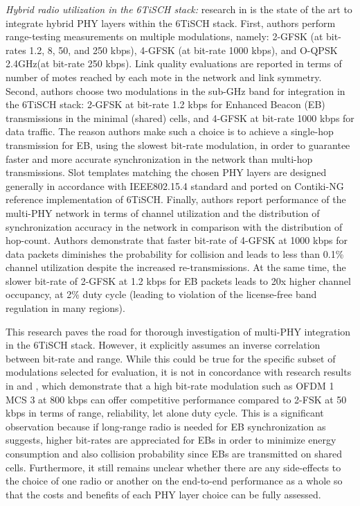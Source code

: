 \documentclass[journal]{IEEEtran}
\newcommand{\oqpsk}        {O-QPSK 2.4GHz}
\begin{document}
\textit{Hybrid radio utilization in the 6TiSCH stack:}  research in \cite{brachmann19ieee} is the state of the art to integrate hybrid PHY layers within the 6TiSCH stack. 
First, authors perform range-testing measurements on multiple modulations, namely: 2-GFSK (at bit-rates 1.2, 8, 50, and 250 kbps), 4-GFSK (at bit-rate 1000 kbps), and \oqpsk (at bit-rate 250 kbps). 
Link quality evaluations are reported in terms of number of motes reached by each mote in the network and link symmetry. 
Second, authors choose two modulations in the sub-GHz band for integration in the 6TiSCH stack: 2-GFSK at bit-rate  1.2 kbps  for Enhanced Beacon (EB) transmissions in the minimal (shared) cells, and 4-GFSK at bit-rate 1000 kbps for data traffic. 
The reason authors make such a choice is to achieve a single-hop transmission for EB, using the slowest bit-rate modulation, in order to guarantee faster and more accurate synchronization in the network than multi-hop transmissions. 
Slot templates matching the chosen PHY layers are designed generally in accordance with IEEE802.15.4 standard and ported on Contiki-NG reference implementation of 6TiSCH. 
Finally, authors report performance of the multi-PHY network in terms of channel utilization and the distribution of synchronization accuracy in the network in comparison with the distribution of hop-count. 
Authors demonstrate that faster bit-rate of 4-GFSK at 1000 kbps for data packets diminishes the probability for collision and leads to less than 0.1\% channel utilization despite the increased re-transmissions.
At the same time, the slower bit-rate of 2-GFSK at 1.2 kbps for EB packets leads to 20x higher channel occupancy, at 2\% duty cycle (leading to violation of the license-free band regulation in many regions). 

This research paves the road for thorough investigation of multi-PHY integration in the 6TiSCH stack.
However, it explicitly assumes an inverse correlation between bit-rate and range.
While this could be true for the specific subset of modulations selected for evaluation, it is not in concordance with research results in \cite{munoz18overview} and \cite{munoz18evaluationa} , which demonstrate that a high bit-rate modulation such as OFDM 1 MCS 3 at 800 kbps can offer competitive performance compared to 2-FSK at 50 kbps in terms of range, reliability, let alone duty cycle. 
This is a significant observation because if long-range radio is needed for EB synchronization as \cite{brachmann19ieee} suggests, higher bit-rates are appreciated for EBs in order to minimize energy consumption and also collision probability since EBs are transmitted on shared cells. 
Furthermore, it still remains unclear whether there are any side-effects to the choice of one radio or another  on the end-to-end performance as a whole so that the costs and benefits of each PHY layer choice can be fully assessed.
\end{document}
